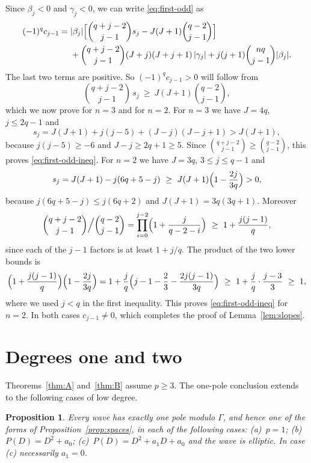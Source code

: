 \documentclass[11pt]{article}
\newtheorem{proposition}[theorem]{Proposition}
\theoremstyle{definition}
\theoremstyle{remark}
\numberwithin{equation}{section}
\begin{document}
Since \(\beta_j<0\) and \(\gamma_j<0\), we can write
\eqref{eq:first-odd} as
\begin{align*}
 (-1)^{q}c_{j-1}={}&|\beta_j|\Bigl[\binom{q+j-2}{j-1}s_j-J(J+1)\binom{q-2}{j-1}\Bigr]\\
 &+\binom{q+j-2}{j-1}(J+j)(J+j+1)\,|\gamma_j|
 +j(j+1)\binom{nq}{j-1}|\beta_j| .
\end{align*}
The last two terms are positive. So \((-1)^qc_{j-1}>0\) will follow
from
\begin{equation}\label{eq:first-odd-ineq}
 \binom{q+j-2}{j-1}\,s_j\ \ge\ J(J+1)\binom{q-2}{j-1},
\end{equation}
which we now prove for \(n=3\) and for \(n=2\). For \(n=3\) we have
\(J=4q\), \(j\le2q-1\) and
\[
 s_j=J(J+1)+j(j-5)+(J-j)(J-j+1)>J(J+1),
\]
because \(j(j-5)\ge-6\) and \(J-j\ge2q+1\ge5\). Since
\(\binom{q+j-2}{j-1}\ge\binom{q-2}{j-1}\), this proves
\eqref{eq:first-odd-ineq}. For \(n=2\) we have \(J=3q\),
\(3\le j\le q-1\) and
\[
 s_j=J(J+1)-j(6q+5-j)\ \ge\ J(J+1)\Bigl(1-\frac{2j}{3q}\Bigr)>0,
\]
because \(j(6q+5-j)\le j(6q+2)\) and \(J(J+1)=3q(3q+1)\). Moreover
\[
 \binom{q+j-2}{j-1}\Big/\binom{q-2}{j-1}
 =\prod_{i=0}^{j-2}\Bigl(1+\frac{j}{q-2-i}\Bigr)
 \ \ge\ 1+\frac{j(j-1)}{q},
\]
since each of the \(j-1\) factors is at least \(1+j/q\). The product
of the two lower bounds is
\[
 \Bigl(1+\frac{j(j-1)}{q}\Bigr)\Bigl(1-\frac{2j}{3q}\Bigr)
 =1+\frac jq\Bigl(j-1-\frac23-\frac{2j(j-1)}{3q}\Bigr)
 \ \ge\ 1+\frac jq\cdot\frac{j-3}{3}\ \ge\ 1,
\]
where we used \(j<q\) in the first inequality. This proves
\eqref{eq:first-odd-ineq} for \(n=2\). In both cases
\(c_{j-1}\ne0\), which completes the proof of
Lemma~\ref{lem:slopes}.

\section{Degrees one and two}\label{sec:low-order}

Theorems~\ref{thm:A} and~\ref{thm:B} assume \(p\ge3\). The one-pole
conclusion extends to the following cases of low degree.

\begin{proposition}\label{prop:low-order}
Every wave has exactly one pole modulo \(\Gamma\), and hence one of the
forms of Proposition~\ref{prop:spaces}, in each of the following cases:
\textup{(a)}~\(p=1\); \textup{(b)}~\(P(D)=D^2+a_0\);
\textup{(c)}~\(P(D)=D^2+a_1D+a_0\) and the wave is elliptic. In case
\textup{(c)} necessarily \(a_1=0\).
\end{proposition}
\end{document}
